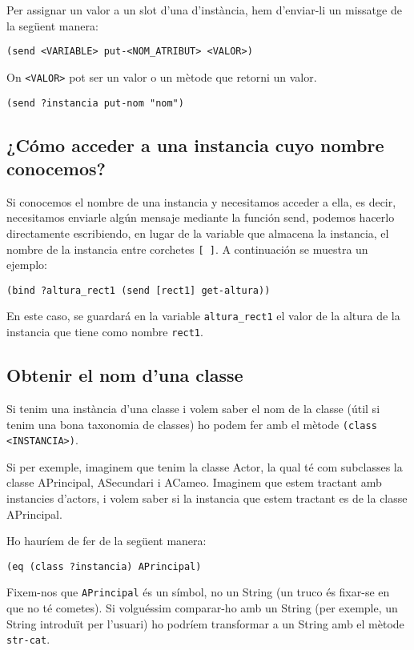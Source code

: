 \documentclass[11pt,svgnames]{scrbook}
\begin{document}
Per assignar un valor a un slot d'una d'instància, hem d'enviar-li un missatge
de la següent manera:
\medskip

\texttt{(send <VARIABLE> put-<NOM\_ATRIBUT> <VALOR>)}
\medskip

On \texttt{<VALOR>} pot ser un valor o un mètode que retorni un valor.
\medskip

\texttt{(send ?instancia put-nom "nom")}


\subsection{¿Cómo acceder a una instancia cuyo nombre conocemos?}

Si conocemos el nombre de una instancia y necesitamos acceder a ella, es decir,
necesitamos enviarle algún mensaje mediante la función send, podemos hacerlo
directamente escribiendo, en lugar de la variable que almacena la instancia, el
nombre de la instancia entre corchetes \texttt{[ ]}. A continuación se muestra
un ejemplo:
\medskip

\texttt{(bind ?altura\_rect1 (send [rect1] get-altura))}
\medskip

 En este caso, se
guardará en la variable \texttt{altura\_rect1} el valor de la altura de la
instancia que tiene como nombre \texttt{rect1}.


\subsection{Obtenir el nom d'una classe}


Si tenim una instància d'una classe i volem saber el nom de la classe (útil si
tenim una bona taxonomia de classes) ho podem fer amb el mètode \texttt{(class
<INSTANCIA>)}.

Si per exemple, imaginem que tenim la classe Actor, la qual té com subclasses la
classe APrincipal, ASecundari  i ACameo. Imaginem que estem tractant amb
instancies d'actors, i volem saber si la instancia que estem tractant es de la
classe APrincipal.

Ho hauríem de fer de la següent manera:
\medskip

\texttt{(eq (class ?instancia) APrincipal)}
\medskip

Fixem-nos que \texttt{APrincipal} és un símbol, no un String (un truco és
fixar-se en que
no té cometes). Si volguéssim comparar-ho amb un String (per exemple, un String
introduït per l'usuari) ho podríem transformar a un String amb el mètode
\texttt{str-cat}.
\medskip
\end{document}
